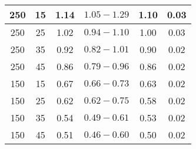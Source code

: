 \documentclass[10pt]{article}
\begin{document}
\begin{center}
\begin{tabular}{|c|c|c|c|c|c|}
\hline
250 & 15 & 1.14 & $1.05-1.29$ & 1.10 & 0.03 \\
\hline
250 & 25 & 1.02 & $0.94-1.10$ & 1.00 & 0.03 \\
\hline
250 & 35 & 0.92 & $0.82-1.01$ & 0.90 & 0.02 \\
\hline
250 & 45 & 0.86 & $0.79-0.96$ & 0.86 & 0.02 \\
\hline
150 & 15 & 0.67 & $0.66-0.73$ & 0.63 & 0.02 \\
\hline
150 & 25 & 0.62 & $0.62-0.75$ & 0.58 & 0.02 \\
\hline
150 & 35 & 0.54 & $0.49-0.61$ & 0.53 & 0.02 \\
\hline
150 & 45 & 0.51 & $0.46-0.60$ & 0.50 & 0.02 \\
\hline
\end{tabular}
\end{center}
\end{document}
